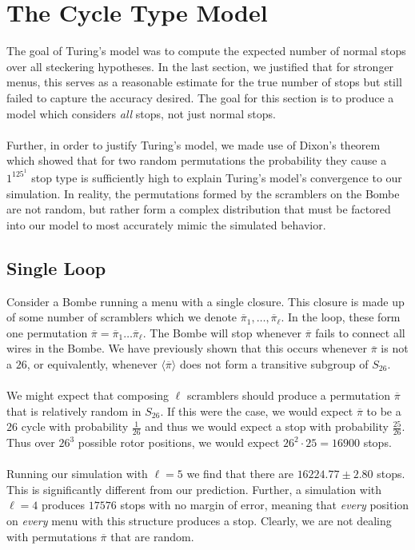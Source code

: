 \section{The Cycle Type Model}
The goal of Turing's model was to compute the expected number of
normal stops over all steckering hypotheses. In the last section, we
justified that for stronger menus, this serves as a reasonable
estimate for the true number of stops but still failed to capture the
accuracy desired. The goal for this section is to produce a model
which considers \emph{all} stops, not just normal stops.
\\\\Further, in order to justify Turing's model, we made use of
Dixon's theorem which showed that for two random permutations the
probability they cause a $1^125^1$ stop type is sufficiently high to
explain Turing's model's convergence to our simulation. In reality,
the permutations formed by the scramblers on the Bombe are not
random, but rather form a complex distribution that must be factored
into our model to most accurately mimic the simulated behavior.
\subsection{Single Loop} Consider a Bombe running a menu with a
single closure. This closure is made up of some number of scramblers
which we denote $\overline\pi_1, \dots, \overline\pi_\ell$. In the
loop, these form one permutation $\overline\pi =
\overline\pi_1\dots\overline\pi_\ell$. The Bombe will stop whenever
$\overline\pi$ fails to connect all wires in the Bombe. We have
previously shown that this occurs whenever $\overline\pi$ is not a
$26$, or equivalently, whenever $\langle\overline\pi\rangle$ does not
form a transitive subgroup of $S_{26}$.
\\\\We might expect that composing $\ell$ scramblers should produce a
permutation $\overline\pi$ that is relatively random in
$S_{26}$. If this were the case, we would expect $\overline\pi$ to be
a $26$ cycle with probability $\frac{1}{26}$ and thus we would expect
a stop with probability $\frac{25}{26}$. Thus over $26^3$ possible
rotor positions, we would expect $26^2\cdot25 = 16900$ stops.
\\\\Running our simulation with $\ell = 5$ we find that there are
$16224.77\pm2.80$ stops. This is significantly different from our
prediction. Further, a simulation with $\ell=4$ produces $17576$
stops with no margin of error, meaning that \emph{every} position on
\emph{every} menu with this structure produces a stop. Clearly, we
are not dealing with permutations $\overline\pi$ that are random.

